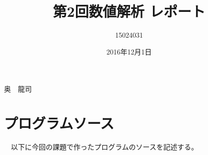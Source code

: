 \documentclass[a4j,titlepage]{jarticle}
\begin{document}

\title{第2回数値解析 レポート}

\author{15024031}{奥　龍司}

\date{2016年12月1日}
\maketitle



\section{プログラムソース}
　以下に今回の課題で作ったプログラムのソースを記述する。
 
\end{document}
